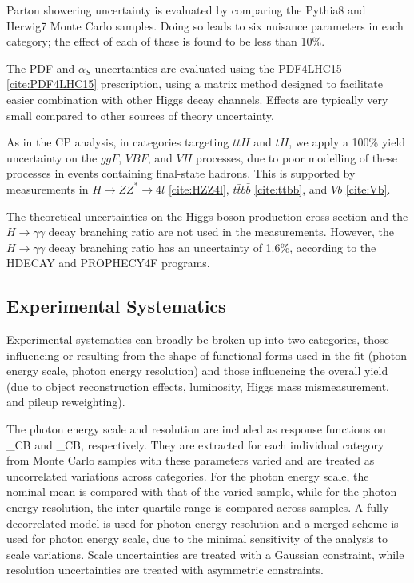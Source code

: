 Parton showering uncertainty is evaluated by comparing the Pythia8 and Herwig7 Monte Carlo samples. Doing so leads to six nuisance parameters in each category; the effect of each of these is found to be less than 10\%.

The PDF and $\alpha_{S}$ uncertainties are evaluated using the PDF4LHC15 \ref{cite:PDF4LHC15} prescription, using a matrix method designed to facilitate easier combination with other Higgs decay channels. Effects are typically very small compared to other sources of theory uncertainty.

As in the CP analysis, in categories targeting $ttH$ and $tH$, we apply a 100\% yield uncertainty on the $ggF$, $VBF$, and $VH$ processes, due to poor modelling of these processes in events containing final-state hadrons. This is supported by measurements in $H \rightarrow ZZ^{*}\rightarrow 4l$ \ref{cite:HZZ4l}, $t\bar{t}b\bar{b}$ \ref{cite:ttbb}, and $Vb$ \ref{cite:Vb}.

The theoretical uncertainties on the Higgs boson production cross section and the $H \rightarrow \gamma \gamma$ decay branching ratio are not used in the measurements. However, the $H \rightarrow \gamma \gamma$ decay branching ratio has an uncertainty of 1.6\%, according to the HDECAY and PROPHECY4F programs.

\subsection{Experimental Systematics} \label{subsec:Experimentalsysts}

Experimental systematics can broadly be broken up into two categories, those influencing or resulting from the shape of functional forms used in the fit (photon energy scale, photon energy resolution) and those influencing the overall yield (due to object reconstruction effects, luminosity, Higgs mass mismeasurement, and pileup reweighting).

The photon energy scale and resolution are included as response functions on \mu_{CB} and \sigma_{CB}, respectively. They are extracted for each individual category from Monte Carlo samples with these parameters varied and are treated as uncorrelated variations across categories. For the photon energy scale, the nominal mean is compared with that of the varied sample, while for the photon energy resolution, the inter-quartile range is compared across samples. A fully-decorrelated model is used for photon energy resolution and a merged scheme is used for photon energy scale, due to the minimal sensitivity of the analysis to scale variations. Scale uncertainties are treated with a Gaussian constraint, while resolution uncertainties are treated with asymmetric constraints.

